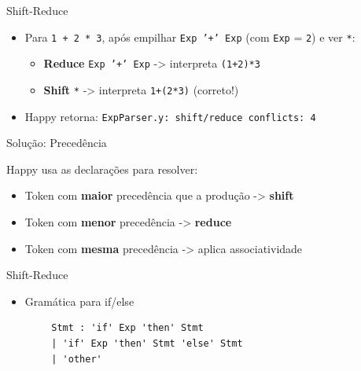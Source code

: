 \begin{frame}[fragile]{Shift-Reduce}

    \begin{itemize}

        \item
        Para \texttt{1 + 2 * 3}, após empilhar
        \texttt{Exp '+' Exp} (com
        \texttt{Exp} = \texttt{2}) e ver
        \texttt{*}:

        \begin{itemize}

            \item
            \textbf{Reduce} \texttt{Exp '+' Exp} -> interpreta
            \texttt{(1+2)*3}
            \item
            \textbf{Shift} \texttt{*} -> interpreta
            \texttt{1+(2*3)} (correto!)
        \end{itemize}
        \item
        Happy retorna:
        \texttt{ExpParser.y: shift/reduce conflicts: 4}
    \end{itemize}
\end{frame}

\begin{frame}{Solução: Precedência}

    Happy usa as declarações para resolver:

    \begin{itemize}

        \item
        Token com \textbf{maior} precedência que a produção -> \textbf{shift}
        \item
        Token com \textbf{menor} precedência -> \textbf{reduce}
        \item
        Token com \textbf{mesma} precedência -> aplica associatividade
    \end{itemize}
\end{frame}

\begin{frame}[fragile]{Shift-Reduce}

    \begin{itemize}

        \item
        Gramática para if/else
    \end{itemize}

    \begin{lstlisting}
        Stmt : 'if' Exp 'then' Stmt
        | 'if' Exp 'then' Stmt 'else' Stmt
        | 'other'
    \end{lstlisting}
\end{frame}

